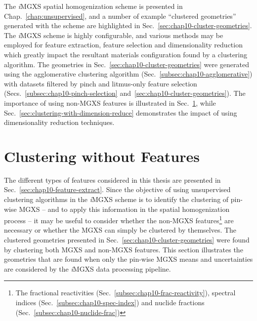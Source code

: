 \begin{appendices}
The \textit{i}\ac{MGXS} spatial homogenization scheme is presented in Chap.~\ref{chap:unsupervised}, and a number of example ``clustered geometries'' generated with the scheme are highlighted in Sec.~\ref{sec:chap10-cluster-geometries}. The \textit{i}\ac{MGXS} scheme is highly configurable, and various methods may be employed for feature extraction, feature selection and dimensionality reduction which greatly impact the resultant materials configuration found by a clustering algorithm. The geometries in Sec.~\ref{sec:chap10-cluster-geometries} were generated using the agglomerative clustering algorithm (Sec.~\ref{subsec:chap10-agglomerative}) with datasets filtered by pinch and litmus-only feature selection (Secs.~\ref{subsec:chap10-pinch-selection} and~\ref{sec:chap10-cluster-geometries}). The importance of using non-\ac{MGXS} features is illustrated in Sec.~\ref{sec:clustering-without-features}, while Sec.~\ref{sec:clustering-with-dimension-reduce} demonstrates the impact of using dimensionality reduction techniques.


\section{Clustering without Features}
\label{sec:clustering-without-features}

The different types of features considered in this thesis are presented in Sec.~\ref{sec:chap10-feature-extract}. Since the objective of using unsupervised clustering algorithms in the \textit{i}\ac{MGXS} scheme is to identify the clustering of pin-wise \ac{MGXS} -- and to apply this information in the spatial homogenization process -- it may be useful to consider whether the non-\ac{MGXS} features\footnote{The fractional reactivities (Sec.~\ref{subsec:chap10-frac-reactivity}), spectral indices (Sec.~\ref{subsec:chap10-spec-index}) and nuclide fractions (Sec.~\ref{subsec:chap10-nuclide-frac})} are necessary or whether the \ac{MGXS} can simply be clustered by themselves. The clustered geometries presented in Sec.~\ref{sec:chap10-cluster-geometries} were found by clustering both \ac{MGXS} and non-\ac{MGXS} features. This section illustrates the geometries that are found when only the pin-wise \ac{MGXS} means and uncertainties are considered by the \textit{i}\ac{MGXS} data processing pipeline.


\end{appendices}
